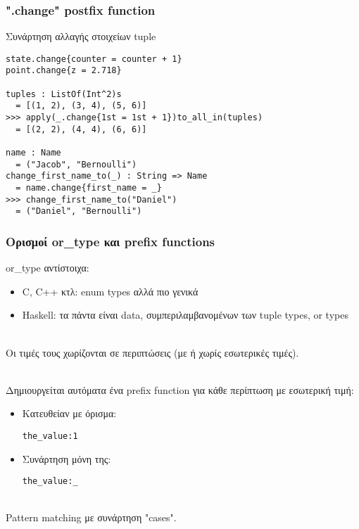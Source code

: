 \documentclass{beamer}
\def\e{\foreignlanguage{english}}
\def\h{\e{Haskell}}
\begin{document}
\begin{frame}[fragile]

\frametitle{\e{".change" postfix function}}

Συνάρτηση αλλαγής στοιχείων \e{tuple}

\begin{otherlanguage}{english}
\begin{verbatim}
state.change{counter = counter + 1}
point.change{z = 2.718}

tuples : ListOf(Int^2)s
  = [(1, 2), (3, 4), (5, 6)]
>>> apply(_.change{1st = 1st + 1})to_all_in(tuples)
  = [(2, 2), (4, 4), (6, 6)]

name : Name
  = ("Jacob", "Bernoulli")
change_first_name_to(_) : String => Name
  = name.change{first_name = _}
>>> change_first_name_to("Daniel")
  = ("Daniel", "Bernoulli")
\end{verbatim}
\end{otherlanguage}

\end{frame}

\begin{frame}[fragile]

\frametitle{Ορισμοί \e{or\_type} και \e{prefix functions}}

\e{or\_type} αντίστοιχα:

\begin{itemize}

\item \e{C, C++} κτλ: \e{enum types} αλλά πιο γενικά

\item \h:
τα πάντα είναι \e{data}, συμπεριλαμβανομένων των \e{tuple types}, \e{or types}
\\~\

\end{itemize}

Οι τιμές τους χωρίζονται σε περιπτώσεις (με ή χωρίς εσωτερικές τιμές).
\\~\

Δημιουργείται αυτόματα ένα \e{prefix function} για κάθε περίπτωση με εσωτερική
τιμή:

\begin{itemize}

\item Κατευθείαν με όρισμα:
\begin{otherlanguage}{english}
\verb|the_value:1|
\end{otherlanguage}

\item Συνάρτηση μόνη της:
\begin{otherlanguage}{english}
\verb|the_value:_|
\\~\
\end{otherlanguage}

\end{itemize}
\e{Pattern matching} με συνάρτηση \e{"cases"}.

\end{frame}
\end{document}
